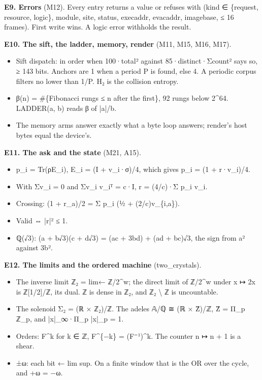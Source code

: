 \textbf{E9. Errors} (M12). Every entry returns a value or refuses with (kind ∈ \{request, resource, logic\}, module, site, status, execaddr, evacaddr, imagebase, ≤ 16 frames). First write wins. A logic error withholds the result.

\textbf{E10. The sift, the ladder, memory, render} (M11, M15, M16, M17).

\begin{itemize}
\item Sift dispatch: in order when 100·total² against 85·distinct·Σcount² says so, ≥ 143 bits. Anchors are 1 when a period P is found, else 4. A periodic corpus filters no lower than 1/P. H₂ is the collision entropy.
\item β(n) = \#\{Fibonacci rungs ≤ n after the first\}, 92 rungs below 2\textasciicircum{}64. LADDER(a, b) reads β of |a|/b.
\item The memory arms answer exactly what a byte loop answers; render's host bytes equal the device's.
\end{itemize}

\textbf{E11. The ask and the state} (M21, A15).

\begin{itemize}
\item p\_\allowbreak{}i = Tr(ρE\_\allowbreak{}i), E\_\allowbreak{}i = (I + v\_\allowbreak{}i·σ)/4, which gives p\_\allowbreak{}i = (1 + r·v\_\allowbreak{}i)/4.
\item With Σv\_\allowbreak{}i = 0 and Σv\_\allowbreak{}i v\_\allowbreak{}iᵀ = c·I, r = (4/c)·Σ p\_\allowbreak{}i v\_\allowbreak{}i.
\item Crossing: (1 + r\_\allowbreak{}a)/2 = Σ p\_\allowbreak{}i (½ + (2/c)v\_\allowbreak{}\{i,a\}).
\item Valid ⇔ |r|² ≤ 1.
\item ℚ(√3): (a + b√3)(c + d√3) = (ac + 3bd) + (ad + bc)√3, the sign from a² against 3b².
\end{itemize}

\textbf{E12. The limits and the ordered machine} (two\_\allowbreak{}crystals).

\begin{itemize}
\item The inverse limit ℤ₂ = lim← ℤ/2\textasciicircum{}w; the direct limit of ℤ/2\textasciicircum{}w under x ↦ 2x is ℤ[1/2]/ℤ, its dual. ℤ is dense in ℤ₂, and ℤ₂ \textbackslash{} ℤ is uncountable.
\item The solenoid Σ₂ = (ℝ × ℤ₂)/ℤ. The adeles 𝔸/ℚ ≅ (ℝ × Ẑ)/ℤ, Ẑ = Π\_\allowbreak{}p ℤ\_\allowbreak{}p, and |x|\_\allowbreak{}∞·Π\_\allowbreak{}p |x|\_\allowbreak{}p = 1.
\item Orders: F\textasciicircum{}k for k ∈ ℤ, F\textasciicircum{}\{−k\} = (F⁻¹)\textasciicircum{}k. The counter n ↦ n + 1 is a shear.
\item ±ω: each bit ← lim sup. On a finite window that is the OR over the cycle, and +ω = −ω.
\end{itemize}

